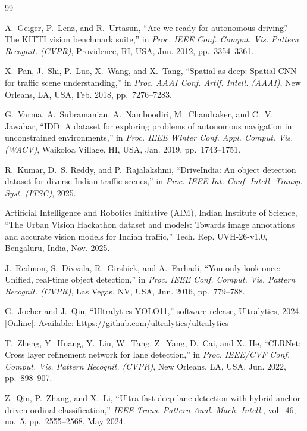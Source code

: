 \documentclass[11pt,a4paper]{report}
\begin{document}
\begin{thebibliography}{99}

A.~Geiger, P.~Lenz, and R.~Urtasun, ``Are we ready for autonomous driving? The
KITTI vision benchmark suite,'' in \textit{Proc. IEEE Conf. Comput. Vis. Pattern
Recognit. (CVPR)}, Providence, RI, USA, Jun. 2012, pp.~3354--3361.

X.~Pan, J.~Shi, P.~Luo, X.~Wang, and X.~Tang, ``Spatial as deep: Spatial CNN for
traffic scene understanding,'' in \textit{Proc. AAAI Conf. Artif. Intell.
(AAAI)}, New Orleans, LA, USA, Feb. 2018, pp.~7276--7283.

G.~Varma, A.~Subramanian, A.~Namboodiri, M.~Chandraker, and C.~V. Jawahar,
``IDD: A dataset for exploring problems of autonomous navigation in
unconstrained environments,'' in \textit{Proc. IEEE Winter Conf. Appl. Comput.
Vis. (WACV)}, Waikoloa Village, HI, USA, Jan. 2019, pp.~1743--1751.

R.~Kumar, D.~S. Reddy, and P.~Rajalakshmi, ``DriveIndia: An object detection
dataset for diverse Indian traffic scenes,'' in \textit{Proc. IEEE Int. Conf.
Intell. Transp. Syst. (ITSC)}, 2025.

Artificial Intelligence and Robotics Initiative (AIM), Indian Institute of
Science, ``The Urban Vision Hackathon dataset and models: Towards image
annotations and accurate vision models for Indian traffic,'' Tech.
Rep. UVH-26-v1.0, Bengaluru, India, Nov. 2025.

J.~Redmon, S.~Divvala, R.~Girshick, and A.~Farhadi, ``You only look once:
Unified, real-time object detection,'' in \textit{Proc. IEEE Conf. Comput. Vis.
Pattern Recognit. (CVPR)}, Las Vegas, NV, USA, Jun. 2016, pp.~779--788.

G.~Jocher and J.~Qiu, ``Ultralytics YOLO11,'' software release, Ultralytics,
2024. [Online]. Available: \url{https://github.com/ultralytics/ultralytics}

T.~Zheng, Y.~Huang, Y.~Liu, W.~Tang, Z.~Yang, D.~Cai, and X.~He, ``CLRNet: Cross
layer refinement network for lane detection,'' in \textit{Proc. IEEE/CVF Conf.
Comput. Vis. Pattern Recognit. (CVPR)}, New Orleans, LA, USA, Jun. 2022,
pp.~898--907.

Z.~Qin, P.~Zhang, and X.~Li, ``Ultra fast deep lane detection with hybrid anchor
driven ordinal classification,'' \textit{IEEE Trans. Pattern Anal. Mach.
Intell.}, vol.~46, no.~5, pp.~2555--2568, May 2024.


\end{thebibliography}
\end{document}
